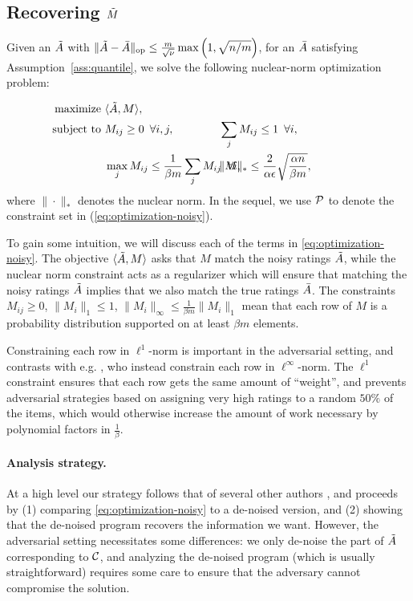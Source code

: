 \subsection{Recovering $\tilde{M}$}
\label{sec:approach-M}
Given an $\tilde{A}$ with $\|\tilde{A} - \bar{A}\|_{\mathrm{op}} \leq \frac{m}{\sqrt{\nu}}\max\left( 1, \sqrt{n/m} \right)$, for an 
$\bar{A}$ satisfying Assumption~\ref{ass:quantile}, we solve the following 
nuclear-norm optimization problem:

\begin{align}
\label{eq:optimization-noisy}
\text{maximize } &\langle \A, M \rangle, \\
\notag \text{ subject to } &M_{ij} \geq 0 \,\,\, \forall i,j, 
  &&\hskip-0.4in\sum_j M_{ij} \leq 1 \,\,\, \forall i, \\
\notag  &\max_j M_{ij} \leq \frac{1}{\beta m}\sum_j M_{ij} \,\,\, \forall i, 
  &&\hskip-0.4in\|M\|_* \leq \frac{2}{\alpha\epsilon}\sqrt{\frac{\alpha n}{\beta m}}, \phantom{xxxxxxx}
\end{align}
where $\|\cdot\|_*$ denotes the nuclear norm. In the sequel, 
we use $\mathcal{P}$ to denote the constraint set in (\ref{eq:optimization-noisy}).

To gain some intuition, we will 
discuss each of the terms in \eqref{eq:optimization-noisy}. The objective 
$\langle \tilde{A}, M \rangle$ asks that $M$ match the noisy ratings 
$\tilde{A}$, while the nuclear norm constraint acts as a regularizer which will 
ensure that matching the noisy ratings $\tilde{A}$ implies that we also match the true 
ratings $\bar{A}$. The constraints $M_{ij} \geq 0$, $\|M_i\|_1 \leq 1$, 
$\|M_i\|_{\infty} \leq \frac{1}{\beta m} \|M_i\|_1$ mean that each row of 
$M$ is a probability distribution supported on at least $\beta m$ elements. 

Constraining each row in $\ell^1$-norm is important in the adversarial setting, 
and contrasts with e.g. \citet{todo}, who instead constrain each row in 
$\ell^{\infty}$-norm. The $\ell^1$ constraint ensures that each row gets the 
same amount of ``weight'', and prevents adversarial strategies based on assigning 
very high ratings to a random $50\%$ of the items, which would otherwise 
increase the amount of work necessary by polynomial factors in $\frac{1}{\beta}$.

\paragraph{Analysis strategy.}
At a high level our strategy follows that of several other authors 
\citep{todo}, and proceeds by (1) comparing \eqref{eq:optimization-noisy} to a 
de-noised version, and (2) showing that the de-noised program recovers the 
information we want. However, the adversarial setting necessitates some 
differences: we only de-noise the part of $\tilde{A}$ corresponding to $\mathcal{C}$, 
and analyzing the de-noised program (which is usually straightforward) requires 
some care to ensure that the adversary cannot compromise the solution.

